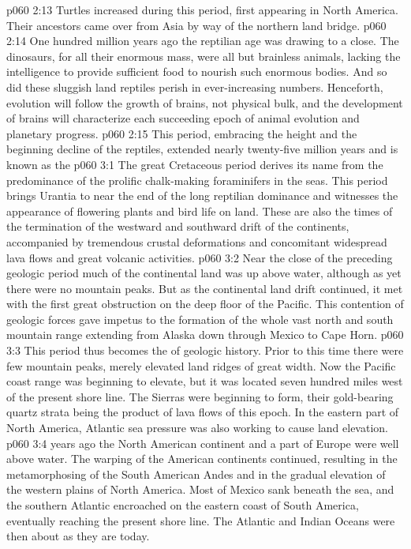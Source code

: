 \vs p060 2:13 Turtles increased during this period, first appearing in North America. Their ancestors came over from Asia by way of the northern land bridge.
\vs p060 2:14 \pc One hundred million years ago the reptilian age was drawing to a close. The dinosaurs, for all their enormous mass, were all but brainless animals, lacking the intelligence to provide sufficient food to nourish such enormous bodies. And so did these sluggish land reptiles perish in ever\hyp{}increasing numbers. Henceforth, evolution will follow the growth of brains, not physical bulk, and the development of brains will characterize each succeeding epoch of animal evolution and planetary progress.
\vs p060 2:15 \pc This period, embracing the height and the beginning decline of the reptiles, extended nearly twenty\hyp{}five million years and is known as the 
\vs p060 3:1 The great Cretaceous period derives its name from the predominance of the prolific chalk\hyp{}making foraminifers in the seas. This period brings Urantia to near the end of the long reptilian dominance and witnesses the appearance of flowering plants and bird life on land. These are also the times of the termination of the westward and southward drift of the continents, accompanied by tremendous crustal deformations and concomitant widespread lava flows and great volcanic activities.
\vs p060 3:2 Near the close of the preceding geologic period much of the continental land was up above water, although as yet there were no mountain peaks. But as the continental land drift continued, it met with the first great obstruction on the deep floor of the Pacific. This contention of geologic forces gave impetus to the formation of the whole vast north and south mountain range extending from Alaska down through Mexico to Cape Horn.
\vs p060 3:3 This period thus becomes the  of geologic history. Prior to this time there were few mountain peaks, merely elevated land ridges of great width. Now the Pacific coast range was beginning to elevate, but it was located seven hundred miles west of the present shore line. The Sierras were beginning to form, their gold\hyp{}bearing quartz strata being the product of lava flows of this epoch. In the eastern part of North America, Atlantic sea pressure was also working to cause land elevation.
\vs p060 3:4 \pc {} years ago the North American continent and a part of Europe were well above water. The warping of the American continents continued, resulting in the metamorphosing of the South American Andes and in the gradual elevation of the western plains of North America. Most of Mexico sank beneath the sea, and the southern Atlantic encroached on the eastern coast of South America, eventually reaching the present shore line. The Atlantic and Indian Oceans were then about as they are today.
